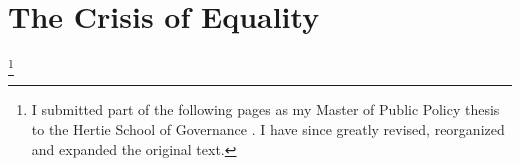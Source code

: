 


\section{The Crisis of Equality}\footnote{I submitted part of the following pages as my Master of Public Policy thesis to the Hertie School of Governance \citep{Held2010a}. I have since greatly revised, reorganized and expanded the original text.}

